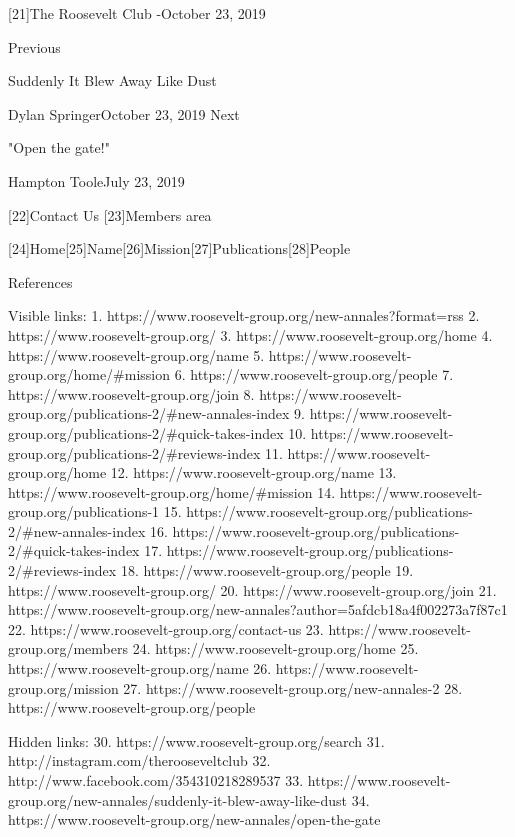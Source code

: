    [21]The Roosevelt Club -October 23, 2019

   Previous

Suddenly It Blew Away Like Dust

   Dylan SpringerOctober 23, 2019
   Next

"Open the gate!"

   Hampton TooleJuly 23, 2019

   [22]Contact Us
   [23]Members area

   [24]Home[25]Name[26]Mission[27]Publications[28]People

References

   Visible links:
   1. https://www.roosevelt-group.org/new-annales?format=rss
   2. https://www.roosevelt-group.org/
   3. https://www.roosevelt-group.org/home
   4. https://www.roosevelt-group.org/name
   5. https://www.roosevelt-group.org/home/#mission
   6. https://www.roosevelt-group.org/people
   7. https://www.roosevelt-group.org/join
   8. https://www.roosevelt-group.org/publications-2/#new-annales-index
   9. https://www.roosevelt-group.org/publications-2/#quick-takes-index
  10. https://www.roosevelt-group.org/publications-2/#reviews-index
  11. https://www.roosevelt-group.org/home
  12. https://www.roosevelt-group.org/name
  13. https://www.roosevelt-group.org/home/#mission
  14. https://www.roosevelt-group.org/publications-1
  15. https://www.roosevelt-group.org/publications-2/#new-annales-index
  16. https://www.roosevelt-group.org/publications-2/#quick-takes-index
  17. https://www.roosevelt-group.org/publications-2/#reviews-index
  18. https://www.roosevelt-group.org/people
  19. https://www.roosevelt-group.org/
  20. https://www.roosevelt-group.org/join
  21. https://www.roosevelt-group.org/new-annales?author=5afdcb18a4f002273a7f87c1
  22. https://www.roosevelt-group.org/contact-us
  23. https://www.roosevelt-group.org/members
  24. https://www.roosevelt-group.org/home
  25. https://www.roosevelt-group.org/name
  26. https://www.roosevelt-group.org/mission
  27. https://www.roosevelt-group.org/new-annales-2
  28. https://www.roosevelt-group.org/people

   Hidden links:
  30. https://www.roosevelt-group.org/search
  31. http://instagram.com/therooseveltclub
  32. http://www.facebook.com/354310218289537
  33. https://www.roosevelt-group.org/new-annales/suddenly-it-blew-away-like-dust
  34. https://www.roosevelt-group.org/new-annales/open-the-gate
